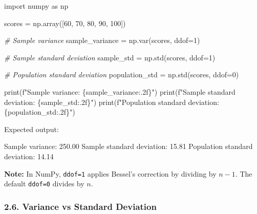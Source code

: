 \documentclass[11pt]{article}
\newenvironment{Shaded}{}{}
\newcommand{\DecValTok}[1]{\textcolor[rgb]{0.25,0.63,0.44}{{#1}}}
\newcommand{\CommentTok}[1]{\textcolor[rgb]{0.38,0.63,0.69}{\textit{{#1}}}}
\newcommand{\NormalTok}[1]{{#1}}
\newcommand{\SpecialCharTok}[1]{\textcolor[rgb]{0.25,0.44,0.63}{{#1}}}
\newcommand{\SpecialStringTok}[1]{\textcolor[rgb]{0.73,0.40,0.53}{{#1}}}
\newcommand{\ImportTok}[1]{{#1}}
\newcommand{\OperatorTok}[1]{\textcolor[rgb]{0.40,0.40,0.40}{{#1}}}
\newcommand{\BuiltInTok}[1]{{#1}}
\begin{document}
\begin{Shaded}
\begin{Highlighting}[]
\ImportTok{import}\NormalTok{ numpy }\ImportTok{as}\NormalTok{ np}

\NormalTok{scores }\OperatorTok{=}\NormalTok{ np.array([}\DecValTok{60}\NormalTok{, }\DecValTok{70}\NormalTok{, }\DecValTok{80}\NormalTok{, }\DecValTok{90}\NormalTok{, }\DecValTok{100}\NormalTok{])}

\CommentTok{\# Sample variance}
\NormalTok{sample\_variance }\OperatorTok{=}\NormalTok{ np.var(scores, ddof}\OperatorTok{=}\DecValTok{1}\NormalTok{)}

\CommentTok{\# Sample standard deviation}
\NormalTok{sample\_std }\OperatorTok{=}\NormalTok{ np.std(scores, ddof}\OperatorTok{=}\DecValTok{1}\NormalTok{)}

\CommentTok{\# Population standard deviation}
\NormalTok{population\_std }\OperatorTok{=}\NormalTok{ np.std(scores, ddof}\OperatorTok{=}\DecValTok{0}\NormalTok{)}

\BuiltInTok{print}\NormalTok{(}\SpecialStringTok{f"Sample variance: }\SpecialCharTok{\{}\NormalTok{sample\_variance}\SpecialCharTok{:.2f\}}\SpecialStringTok{"}\NormalTok{)}
\BuiltInTok{print}\NormalTok{(}\SpecialStringTok{f"Sample standard deviation: }\SpecialCharTok{\{}\NormalTok{sample\_std}\SpecialCharTok{:.2f\}}\SpecialStringTok{"}\NormalTok{)}
\BuiltInTok{print}\NormalTok{(}\SpecialStringTok{f"Population standard deviation: }\SpecialCharTok{\{}\NormalTok{population\_std}\SpecialCharTok{:.2f\}}\SpecialStringTok{"}\NormalTok{)}
\end{Highlighting}
\end{Shaded}

Expected output:

\begin{Shaded}
\begin{Highlighting}[]
\NormalTok{Sample variance: 250.00}
\NormalTok{Sample standard deviation: 15.81}
\NormalTok{Population standard deviation: 14.14}
\end{Highlighting}
\end{Shaded}

\textbf{Note:} In NumPy, \texttt{ddof=1} applies Bessel's correction by
dividing by \(n-1\). The default \texttt{ddof=0} divides by \(n\).

\subsubsection{2.6. Variance vs Standard
Deviation}\label{variance-vs-standard-deviation}
\end{document}
